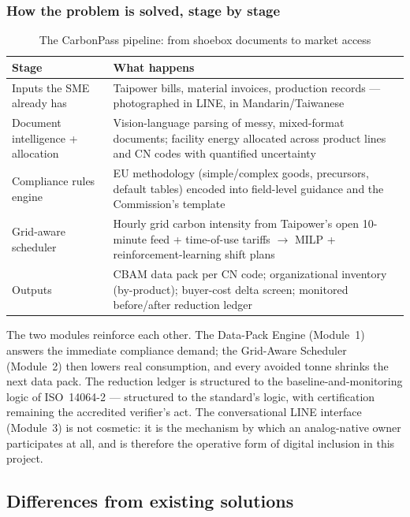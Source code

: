 \subsubsection*{How the problem is solved, stage by stage}

\begin{table}[htbp]
\caption{The CarbonPass pipeline: from shoebox documents to market access}
\label{tab:pipeline}
\small
\begin{tabularx}{\textwidth}{@{}p{}X@{}}
\toprule
\textbf{Stage} & \textbf{What happens} \\
\midrule
Inputs the SME already has & Taipower bills, material invoices, production records --- photographed in LINE, in Mandarin/Taiwanese \\
Document intelligence + allocation & Vision-language parsing of messy, mixed-format documents; facility energy allocated across product lines and CN codes with quantified uncertainty \\
Compliance rules engine & EU methodology (simple/complex goods, precursors, default tables\cite{omm}) encoded into field-level guidance and the Commission's template \\
Grid-aware scheduler & Hourly grid carbon intensity from Taipower's open 10-minute feed\cite{taipowerdata} + time-of-use tariffs\cite{taipower} $\to$ MILP + reinforcement-learning shift plans \\
Outputs & CBAM data pack per CN code; organizational inventory (by-product); buyer-cost delta screen; monitored before/after reduction ledger \\
\bottomrule
\end{tabularx}
\end{table}

The two modules reinforce each other. The Data-Pack Engine (Module~1) answers
the immediate compliance demand; the Grid-Aware Scheduler (Module~2) then
lowers real consumption, and every avoided tonne shrinks the next data pack.
The reduction ledger is structured to the baseline-and-monitoring logic of
ISO~14064-2 --- structured to the standard's logic, with certification
remaining the accredited verifier's act. The conversational LINE interface
(Module~3) is not cosmetic: it is the mechanism by which an analog-native owner
participates at all, and is therefore the operative form of digital inclusion
in this project.

\subsection{Differences from existing solutions}\label{sec:diff}

